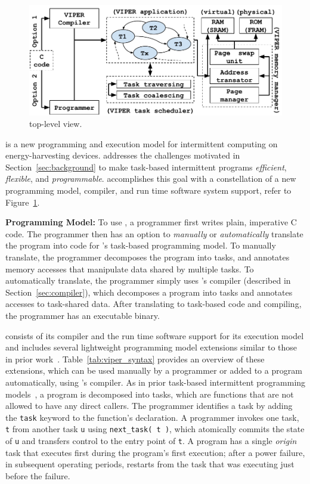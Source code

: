 \begin{figure}
	\centering
	\includegraphics[width=\columnwidth]{figures/viper_block_diagram.pdf}
	\caption{\sys top-level view.}
	\label{fig:system_overview}
\end{figure}

\sys is a new programming and execution model for intermittent computing on energy-harvesting devices. \sys addresses the challenges motivated in Section~\ref{sec:background} to make task-based intermittent programs {\em efficient}, {\em flexible}, and {\em programmable}. \sys accomplishes this goal with a constellation of a new programming model, compiler, and run time software system support, refer to Figure~\ref{fig:system_overview}.

\noindent \textbf{\sys Programming Model:} To use \sys, a programmer first writes plain, imperative C code. The programmer then has an option to {\em manually} or {\em automatically} translate the program into code for \sys's task-based programming model. To manually translate, the programmer decomposes the program into tasks, and annotates memory accesses that manipulate data shared by multiple tasks. To automatically translate, the programmer simply uses \sys's compiler (described in Section~\ref{sec:compiler}), which decomposes a program into tasks and annotates accesses to task-shared data. After translating to task-based code and compiling, the programmer has an executable \sys binary.

\sys consists of its compiler and the run time software support for its execution model and includes several lightweight programming model extensions similar to those in prior work~\cite{chain,alpaca}. Table~\ref{tab:viper_syntax} provides an overview of these extensions, which can be used manually by a programmer or added to a program automatically, using \sys's compiler. As in prior task-based intermittent programming models~\cite{chain,alpaca}, a \sys program is decomposed into tasks, which are functions that are not allowed to have any direct callers. The programmer identifies a task by adding the {\tt task} keyword to the function's declaration. A programmer invokes one task, {\tt t} from another task {\tt u} using {\tt next\_task( t )}, which atomically commits the state of {\tt u} and transfers control to the entry point of {\tt t}. A program has a single {\em origin} task that executes first during the program's first execution; after a power failure, in subsequent operating periods, \sys restarts from the task that was executing just before the failure.


